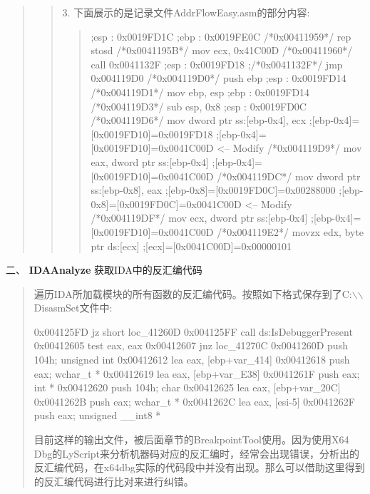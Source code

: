\documentclass[AutoFakeBold,AutoFakeSlant]{article}
\begin{document}
\begin{flushleft}
\begin{quote}
\begin{quote}
			\end{quote}
		
			\newpage	
		
			\begin{quote}
				3. 下面展示的是记录文件AddrFlowEasy.asm的部分内容:
				\begin{quote}
				\begin{x86asmcode}
;esp : 0x0019FD1C
;ebp : 0x0019FE0C
/*0x00411959*/    rep stosd
/*0x0041195B*/    mov ecx, 0x41C00D
/*0x00411960*/    call 0x0041132F
;esp : 0x0019FD18
;/*0x0041132F*/    jmp 0x004119D0
/*0x004119D0*/    push ebp
;esp : 0x0019FD14
/*0x004119D1*/    mov ebp, esp
;ebp : 0x0019FD14
/*0x004119D3*/    sub esp, 0x8
;esp : 0x0019FD0C
/*0x004119D6*/    mov dword ptr ss:[ebp-0x4], ecx
;[ebp-0x4]=[0x0019FD10]=0x0019FD18
;[ebp-0x4]=[0x0019FD10]=0x0041C00D  <-- Modify
/*0x004119D9*/    mov eax, dword ptr ss:[ebp-0x4]
;[ebp-0x4]=[0x0019FD10]=0x0041C00D
/*0x004119DC*/    mov dword ptr ss:[ebp-0x8], eax
;[ebp-0x8]=[0x0019FD0C]=0x00288000
;[ebp-0x8]=[0x0019FD0C]=0x0041C00D  <-- Modify
/*0x004119DF*/    mov ecx, dword ptr ss:[ebp-0x4]
;[ebp-0x4]=[0x0019FD10]=0x0041C00D
/*0x004119E2*/    movzx edx, byte ptr ds:[ecx]
;[ecx]=[0x0041C00D]=0x00000101
				\end{x86asmcode}
				\end{quote}
			\end{quote}
		\end{quote}
	\end{flushleft}
	
	\newpage
	
	\begin{flushleft}
		\begin{LARGE}
			二、 \textbf{IDAAnalyze} 获取IDA中的反汇编代码
		\end{LARGE}
		
		\bigskip
		\bigskip
		
		\large 
		\linespread{1.6} \selectfont
		\begin{quote}
		遍历IDA所加载模块的所有函数的反汇编代码。按照如下格式保存到了C:$\backslash$$\backslash$DisasmSet文件中:
		\begin{x86asmcode}
	0x004125FD    jz      short loc_41260D
	0x004125FF    call    ds:IsDebuggerPresent
	0x00412605    test    eax, eax
	0x00412607    jnz     loc_41270C
	0x0041260D    push    104h; unsigned int
	0x00412612    lea     eax, [ebp+var_414]
	0x00412618    push    eax; wchar_t *
	0x00412619    lea     eax, [ebp+var_E38]
	0x0041261F    push    eax; int *
	0x00412620    push    104h; char
	0x00412625    lea     eax, [ebp+var_20C]
	0x0041262B    push    eax; wchar_t *
	0x0041262C    lea     eax, [esi-5]
	0x0041262F    push    eax; unsigned __int8 *
		\end{x86asmcode}
		
		目前这样的输出文件，被后面章节的BreakpointTool使用。因为使用X64 Dbg的LyScript来分析机器码对应的反汇编时，经常会出现错误，分析出的反汇编代码，在x64dbg实际的代码段中并没有出现。那么可以借助这里得到的反汇编代码进行比对来进行纠错。
		\end{quote}
	\end{flushleft}
	
\end{document}
